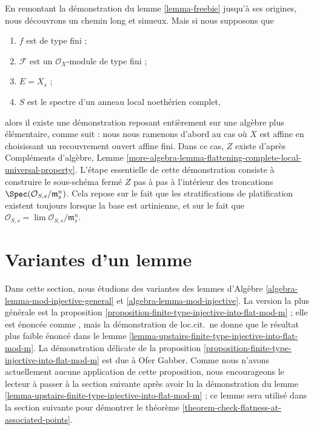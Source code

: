 \begin{remark}
\label{remark-flattening-complete-noetherian}
En remontant la démonstration du
lemme \ref{lemma-freebie}
jusqu'à ses origines, nous découvrons un chemin long et sinueux. Mais si nous supposons que
\begin{enumerate}
\item $f$ est de type fini ;
\item $\mathcal{F}$ est un $\mathcal{O}_X$-module de type fini ;
\item $E = X_s$ ;
\item $S$ est le spectre d'un anneau local noethérien complet,
\end{enumerate}
alors il existe une démonstration reposant entièrement sur une algèbre plus élémentaire,
comme suit : nous nous ramenons d'abord au cas où $X$ est affine en choisissant
un recouvrement ouvert affine fini. Dans ce cas, $Z$ existe d'après
Compléments d'algèbre,
Lemme \ref{more-algebra-lemma-flattening-complete-local-universal-property}.
L'étape essentielle de cette démonstration consiste à construire le sous-schéma fermé $Z$
pas à pas à l'intérieur des troncations
$\Spec(\mathcal{O}_{S, s}/\mathfrak m_s^n)$.
Cela repose sur le fait que les stratifications de platification existent toujours
lorsque la base est artinienne, et sur le fait que
$\mathcal{O}_{S, s} = \lim \mathcal{O}_{S, s}/\mathfrak m_s^n$.
\end{remark}




\section{Variantes d'un lemme}
\label{section-variants-mod-injective}

\noindent
Dans cette section, nous étudions des variantes des
lemmes d'Algèbre \ref{algebra-lemma-mod-injective-general} et
\ref{algebra-lemma-mod-injective}.
La version la plus générale est la
proposition \ref{proposition-finite-type-injective-into-flat-mod-m} ;
elle est énoncée comme \cite[Lemme 4.2.2]{GruRay}, mais la démonstration de
loc.cit.\ ne donne que le résultat plus faible énoncé dans le
lemme \ref{lemma-upstairs-finite-type-injective-into-flat-mod-m}.
La démonstration délicate de la
proposition \ref{proposition-finite-type-injective-into-flat-mod-m}
est due à Ofer Gabber. Comme nous n'avons actuellement aucune application de
cette proposition, nous encourageons le lecteur à passer à la section suivante
après avoir lu la démonstration du
lemme \ref{lemma-upstairs-finite-type-injective-into-flat-mod-m} ;
ce lemme sera utilisé dans la section suivante pour démontrer le
théorème \ref{theorem-check-flatness-at-associated-points}.

